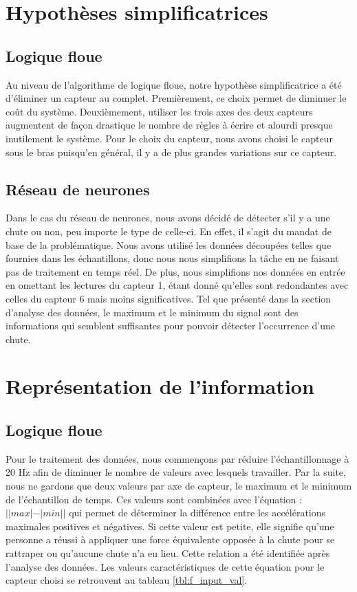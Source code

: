 \documentclass[12pt,letterpaper]{article}
\begin{document}
\section{Hypothèses simplificatrices}

\subsection{Logique floue}

Au niveau de l'algorithme de logique floue, notre hypothèse simplificatrice a été d'éliminer un capteur au complet. Premièrement, ce choix permet de diminuer le coût du système. Deuxièmement, utiliser les trois axes des deux capteurs augmentent de façon drastique le nombre de règles à écrire et alourdi presque inutilement le système. Pour le choix du capteur, nous avons choisi le capteur sous le bras puisqu'en général, il y a de plus grandes variations sur ce capteur.

\subsection{Réseau de neurones} %
Dans le cas du réseau de neurones, nous avons décidé de détecter s'il y a une chute ou non, peu importe le type de celle-ci. En effet, il s'agit du mandat de base de la problématique. Nous avons utilisé les données découpées telles que fournies dans les échantillons, donc nous nous simplifions la tâche en ne faisant pas de traitement en temps réel. De plus, nous simplifions nos données en entrée en omettant les lectures du capteur 1, étant donné qu'elles sont redondantes avec celles du capteur 6 mais moins significatives. Tel que présenté dans la section d'analyse des données, le maximum et le minimum du signal sont des informations qui semblent suffisantes pour pouvoir détecter l'occurrence d'une chute.

\section{Représentation de l'information}

\subsection{Logique floue}
Pour le traitement des données, nous commençons par réduire l'échantillonnage à 20 Hz afin de diminuer le nombre de valeurs avec lesquels travailler. Par la suite, nous ne gardons que deux valeurs par axe de capteur, le maximum et le minimum de l'échantillon de temps. Ces valeurs sont combinées avec l'équation : $||max|-|min||$ qui permet de déterminer la différence entre les accélérations maximales positives et négatives. Si cette valeur est petite, elle signifie qu'une personne a réussi à appliquer une force équivalente opposée à la chute pour se rattraper ou qu'aucune chute n'a eu lieu. Cette relation a été identifiée après l'analyse des données. Les valeurs caractéristiques de cette équation pour le capteur choisi se retrouvent au tableau \ref{tbl:f_input_val}.
\end{document}

